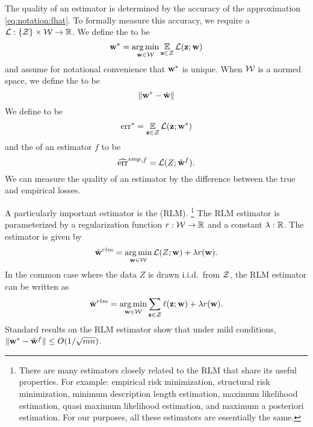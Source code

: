 \documentclass[thesis.tex]{subfiles}
\newcommand{\riskstar}{{\textrm{err}^*}}
\newcommand{\riskemp}{\widehat{\textrm{err}}^\textit{emp}}
\begin{document}
The quality of an estimator is determined by the accuracy of the approximation \eqref{eq:notation:fhat}.
To formally measure this accuracy, 
we require a  $\mathcal{L} : \{{\mathcal Z}\} \times {\mathcal W} \to \mathbb R$. 
We define the  to be 
\begin{equation}
    {\mathbf w^{*}} = \operatorname*{arg\,min}_{\mathbf w\in{\mathcal W}} \operatorname*{\mathbb E}_{\mathbf z\in{\mathcal Z}}\mathcal{L}(\mathbf z;\mathbf w)
\end{equation}
and assume for notational convenience that ${\mathbf w^{*}}$ is unique.
When ${\mathcal W}$ is a normed space, we define the  to be
\begin{equation}
    {\lVert {{\mathbf w^{*}}-{\hat{\mathbf w}}} \rVert}
\end{equation}
We define  to be
\begin{equation}
    \riskstar = \E_{\z\in\Z}\Loss(\z;\wstar)
\end{equation}
and the  of an estimator $f$ to be 
\begin{equation}
    \riskemp{}^{,f} = \Loss(Z;\what^f)
    .
\end{equation}
We can measure the quality of an estimator by the difference between the true and empirical losses.

A particularly important estimator is the  (RLM).%
\footnote{
    There are many estimators closely related to the RLM that share its useful properties.
    For example: 
    empirical risk minimization,
    structural risk minimization,
    minimum description length estimation,
    maximum likelihood estimation, 
    quasi maximum likelihood estimation,
    and maximum a posteriori estimation.
    For our purposes, all these estimators are essentially the same.
}
The RLM estimator is parameterized by a regularization function $r : {\mathcal W} \to \mathbb R$ 
and a constant $\lambda : \mathbb R$.
The estimator is given by
\begin{equation}
    \hat{\mathbf w}^{rlm} = \operatorname*{arg\,min}_{\mathbf w\in{\mathcal W}} \mathcal{L}(Z;\mathbf w) + \lambda r(\mathbf w)
    .
\end{equation}
In the common case where the data $Z$ is drawn i.i.d.\ from ${\mathcal Z}$, the RLM estimator can be written as
\begin{equation}
    \hat{\mathbf w}^{rlm} = \operatorname*{arg\,min}_{\mathbf w\in{\mathcal W}} \sum_{\mathbf z\in{\mathcal Z}}\ell(\mathbf z;\mathbf w) + \lambda r(\mathbf w)
    .
\end{equation}
Standard results on the RLM estimator show that under mild conditions,
${\lVert {{\mathbf w^{*}}-{\hat{\mathbf w}}^f} \rVert}\le O(1/\sqrt{mn})$.
\end{document}
